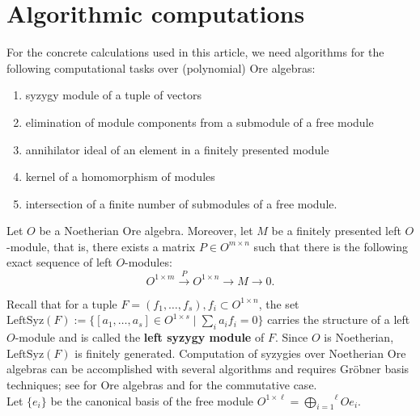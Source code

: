 \documentclass[a4paper,10pt]{article}
\theoremstyle{nonumberplain}
\begin{document}
\section{Algorithmic computations}

For the concrete calculations used in this article, we need 
algorithms for the following computational tasks over (polynomial) 
Ore algebras:

\begin{enumerate}
\item syzygy module of a tuple of vectors
\item elimination of module components from a submodule of a free module
\item annihilator ideal of an element in a finitely presented module
\item kernel of a homomorphism of modules
\item intersection of a finite number of submodules of a free module.
\end{enumerate}

Let $O$ be a Noetherian Ore algebra. 
Moreover, let $M$ be a finitely presented left $O$-module, that is, there exists a matrix $P\in O^{m \times n}$ such that there is the following exact sequence of left $O$-modules:
\[
O^{1\times m} \stackrel{P}{\rightarrow} O^{1 \times n} \rightarrow M \rightarrow 0.
\]

Recall that for a tuple $F= (f_1,\ldots,f_s), f_i \subset O^{1\times n}$, 
the set
$\mathrm{LeftSyz}(F) := \{ [a_1,\ldots,a_s] \in O^{1\times s} \mid  \sum_i a_i f_i = 0 \}$ 
carries the structure of a left $O$-module and is called the \textbf{left syzygy module} of $F$. Since $O$ is Noetherian, $\mathrm{LeftSyz}(F)$ is finitely generated. 
Computation of syzygies over Noetherian Ore algebras can be accomplished with
several algorithms and requires Gr\"obner basis techniques; see \cite{Kr} for Ore algebras and \cite{GPS05} for the commutative case. \\

Let $\{e_i \}$ be the canonical basis of the free module 
$O^{1\times \ell} = \overset{\ell}{\underset{i=1}{\bigoplus}} O e_i$.

\end{document}
